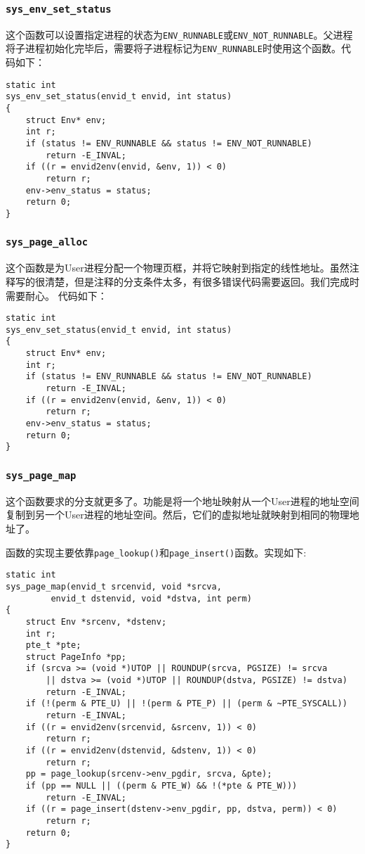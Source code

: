 \documentclass[11pt]{article}
\begin{document}
\subsubsection{\lstinline|sys_env_set_status|}
这个函数可以设置指定进程的状态为\lstinline|ENV_RUNNABLE|或\lstinline|ENV_NOT_RUNNABLE|。父进程将子进程初始化完毕后，需要将子进程标记为\lstinline|ENV_RUNNABLE|时使用这个函数。代码如下：

\begin{lstlisting}[title=kern/syscall.c]
static int
sys_env_set_status(envid_t envid, int status)
{
	struct Env* env;
	int r;
	if (status != ENV_RUNNABLE && status != ENV_NOT_RUNNABLE)
		return -E_INVAL;
	if ((r = envid2env(envid, &env, 1)) < 0)
		return r;
	env->env_status = status;
	return 0;
}
\end{lstlisting}

\subsubsection{\lstinline|sys_page_alloc|}
这个函数是为User进程分配一个物理页框，并将它映射到指定的线性地址。虽然注释写的很清楚，但是注释的分支条件太多，有很多错误代码需要返回。我们完成时需要耐心。
代码如下：
\begin{lstlisting}[title=kern/syscall.c]
static int
sys_env_set_status(envid_t envid, int status)
{
	struct Env* env;
	int r;
	if (status != ENV_RUNNABLE && status != ENV_NOT_RUNNABLE)
		return -E_INVAL;
	if ((r = envid2env(envid, &env, 1)) < 0)
		return r;
	env->env_status = status;
	return 0;
}
\end{lstlisting}

\subsubsection{\lstinline|sys_page_map|}
这个函数要求的分支就更多了。功能是将一个地址映射从一个User进程的地址空间复制到另一个User进程的地址空间。然后，它们的虚拟地址就映射到相同的物理地址了。

函数的实现主要依靠\lstinline|page_lookup()|和\lstinline|page_insert()|函数。实现如下:
\begin{lstlisting}[title=kern/syscall.c]
static int
sys_page_map(envid_t srcenvid, void *srcva,
	     envid_t dstenvid, void *dstva, int perm)
{
	struct Env *srcenv, *dstenv;
	int r;
	pte_t *pte;
	struct PageInfo *pp;
	if (srcva >= (void *)UTOP || ROUNDUP(srcva, PGSIZE) != srcva
		|| dstva >= (void *)UTOP || ROUNDUP(dstva, PGSIZE) != dstva)
		return -E_INVAL;
	if (!(perm & PTE_U) || !(perm & PTE_P) || (perm & ~PTE_SYSCALL))
		return -E_INVAL;
 	if ((r = envid2env(srcenvid, &srcenv, 1)) < 0)
		return r;
	if ((r = envid2env(dstenvid, &dstenv, 1)) < 0)
		return r;
	pp = page_lookup(srcenv->env_pgdir, srcva, &pte); 
	if (pp == NULL || ((perm & PTE_W) && !(*pte & PTE_W))) 
		return -E_INVAL;
	if ((r = page_insert(dstenv->env_pgdir, pp, dstva, perm)) < 0)
		return r;
	return 0;
}
\end{lstlisting}
\end{document}
